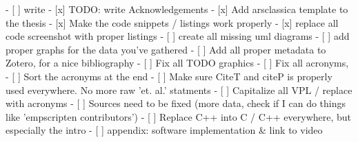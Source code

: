 \begin{note}
  - [ ] write 
  - [x] TODO: write Acknowledgements
  - [x] Add arsclassica template to the thesis
  - [x] Make the code snippets / listings work properly
  - [x] replace all code screenshot with proper listings
  - [ ] create all missing uml diagrams
  - [ ] add proper graphs for the data you've gathered 
  - [ ] Add all proper metadata to Zotero, for a nice bibliography
  - [ ] Fix all TODO graphics
  - [ ] Fix all acronyms,
  - [ ] Sort the acronyms at the end 
  - [ ] Make sure CiteT and citeP is properly used everywhere. No more raw 'et. al.' statments 
  - [ ] Capitalize all VPL / replace with acronyms
  - [ ] Sources need to be fixed (more data, check if I can do things like 'empscripten contributors')
  - [ ] Replace C++ into C / C++ everywhere, but especially the intro
  - [ ] appendix: software implementation & link to video
\end{note}
